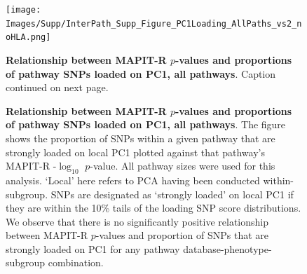 \setlength{\footskip}{3cm}
\begin{figure}[htbp]
\centering
\vspace*{-2cm}
\texttt{[image: Images/Supp/InterPath\_Supp\_Figure\_PC1Loading\_AllPaths\_vs2\_noHLA.png]}
\caption[TBD]{\textbf{Relationship between MAPIT-R $p$-values and proportions of pathway SNPs loaded on PC1, all pathways}. Caption continued on next page.}
\label{InterPath-Supp-Figure-PC1Loading-AllPaths}
\end{figure}
\clearpage
\setlength{\footskip}{1cm}

\addtocounter{figure}{-1}
\begin{figure} [t!]
  \caption{\textbf{Relationship between MAPIT-R $p$-values and proportions of pathway SNPs loaded on PC1, all pathways}. The figure shows the proportion of SNPs within a given pathway that are strongly loaded on local PC1 plotted against that pathway's MAPIT-R -$\log_{10}$ $p$-value. All pathway sizes were used for this analysis. `Local' here refers to PCA having been conducted within-subgroup. SNPs are designated as `strongly loaded' on local PC1 if they are within the 10\% tails of the loading SNP score distributions. We observe that there is no significantly positive relationship between MAPIT-R $p$-values and proportion of SNPs that are strongly loaded on PC1 for any pathway database-phenotype-subgroup combination.}
\label{InterPath-Supp-Figure-PC1Loading-AllPaths-Caption}
\end{figure}
\clearpage


